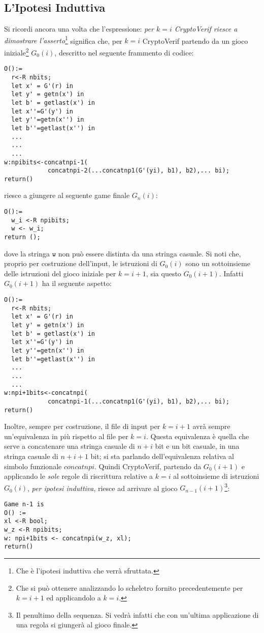 \documentclass[a4paper,openright,twoside,12pt]{report}
\begin{document}
\subsection{L'Ipotesi Induttiva}
Si ricordi ancora una volta che l'espressione: \emph{per $k=i$ CryptoVerif riesce a dimostrare l'asserto}\footnote{Che \`e l'ipotesi induttiva che verr\`a sfruttata.}
significa che, per $k=i$ CryptoVerif partendo da un gioco iniziale\footnote{Che si pu\`o ottenere analizzando lo scheletro fornito 
precedentemente per $k=i+1$ ed applicandolo a $k=i$.} $G_0(i)$, descritto nel seguente frammento di codice:
\begin{verbatim}
O():=
  r<-R nbits;
  let x' = G'(r) in
  let y' = getn(x') in
  let b' = getlast(x') in
  let x''=G'(y') in
  let y''=getn(x'') in
  let b''=getlast(x'') in
  ...
  ...
  ...
w:npibits<-concatnpi-1(
            concatnpi-2(...concatnp1(G'(yi), b1), b2),... bi);
return()
\end{verbatim}
riesce a giungere al seguente game finale $G_n(i)$:
\begin{verbatim}
O():=
  w_i <-R npibits;
  w <- w_i;
return ();
\end{verbatim}
dove la stringa $\texttt{w}$ non pu\`o essere distinta da una stringa casuale.
Si noti che, proprio per costruzione dell'input, le istruzioni di $G_0(i)$ sono un sottoinsieme delle istruzioni del gioco iniziale per $k=i+1$, sia questo $G_0(i+1)$.
Infatti $G_0(i+1)$ ha il seguente aspetto:
\begin{verbatim}
O():=
  r<-R nbits;
  let x' = G'(r) in
  let y' = getn(x') in
  let b' = getlast(x') in
  let x''=G'(y') in
  let y''=getn(x'') in
  let b''=getlast(x'') in
  ...
  ...
  ...
w:npi+1bits<-concatnpi(
            concatnpi-1(...concatnp1(G'(yi), b1), b2),... bi);
return()
\end{verbatim}
Inoltre, sempre per costruzione, il file di input per $k=i+1$ avr\`a sempre un'equivalenza in pi\`u rispetto al file per $k=i$. Questa equivalenza \`e quella che serve a concatenare una stringa casuale di $n+i$ bit e un bit casuale, in una stringa
casuale di $n+i+1$ bit; si sta parlando dell'equivalenza relativa al simbolo funzionale $concatnpi$.
Quindi CryptoVerif, partendo da $G_0(i+1)$ e applicando le \emph{sole} regole di riscrittura relative a $k=i$ 
al sottoinsieme di istruzioni $G_0(i)$, \emph{per ipotesi induttiva}, riesce ad arrivare al gioco $G_{n-1}(i+1)$\footnote{Il penultimo della sequenza. 
Si vedr\`a infatti che con un'ultima applicazione di una regola si giunger\`a al gioco finale.}:
\begin{verbatim}
Game n-1 is
O() :=
xl <-R bool;
w_z <-R npibits;
w: npi+1bits <- concatnpi(w_z, xl);
return()
\end{verbatim}
\end{document}
